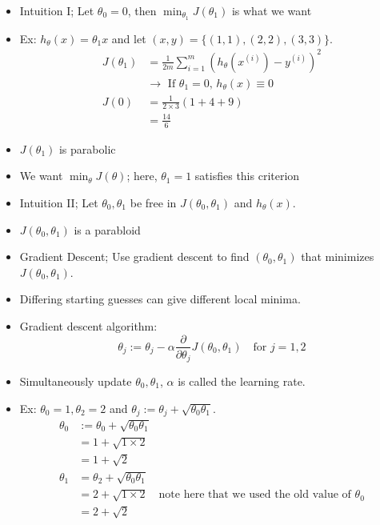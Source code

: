 \documentclass[10pt]{article}
\begin{document}
\begin{itemize}
  \item Intuition I; Let $\theta_0=0$, then $\min_{\theta_1}J(\theta_1)$ is what we want
  \item Ex: $h_{\theta}(x)=\theta_1x$ and let $(x,y) = \{ (1,1), (2,2), (3,3) \}$.
    \begin{align*}
      J(\theta_1) &= \frac{1}{2m} \sum_{i=1}^m \left( h_{\theta}(x^{(i)}) - y^{(i)} \right)^2 \\
      &\rightarrow \text{ If $\theta_1=0$, $h_{\theta}(x) \equiv 0$} \\
      J(0) &= \frac{1}{2 \times 3} \left( 1 + 4+9\right) \\ 
      &= \frac{14}{6}
    \end{align*}
  \item $J(\theta_1)$ is parabolic
  \item We want $\min_{\theta}J(\theta)$; here, $\theta_1=1$ satisfies this criterion
  \item Intuition II; Let $\theta_0, \theta_1$ be free in $J(\theta_0, \theta_1)$ and $h_{\theta}(x)$.
  \item $J(\theta_0, \theta_1)$ is a parabloid
  \item Gradient Descent; Use gradient descent to find $(\theta_0, \theta_1)$ that minimizes $J(\theta_0, \theta_1)$.
  \item Differing starting guesses can give different local minima.
  \item Gradient descent algorithm:
    \begin{equation*}
      \theta_j := \theta_j - \alpha \frac{\partial}{\partial \theta_j} J(\theta_0, \theta_1) \quad \text{for $j=1,2$}
    \end{equation*}
  \item Simultaneously update $\theta_0, \theta_1$, $\alpha$ is called the learning rate.
  \item Ex: $\theta_0=1, \theta_2=2$ and $\theta_j := \theta_j + \sqrt{\theta_0 \theta_1}$.
    \begin{align*}
      \theta_0 &:= \theta_0 + \sqrt{\theta_0 \theta_1} \\
      &= 1 + \sqrt{1 \times 2} \\
      &= 1 + \sqrt{2} \\
      \theta_1 &= \theta_2 + \sqrt{ \theta_0 \theta_1 } \\
      &= 2 + \sqrt{1 \times 2} \quad \text{note here that we used the old value of $\theta_0$} \\
      &= 2 + \sqrt{2}
    \end{align*}
\end{itemize}
\end{document}
